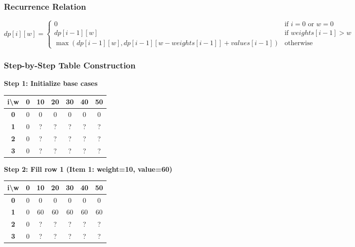 \documentclass[12pt,a4paper]{article}
\begin{document}
\subsubsection{Recurrence Relation}
\begin{equation}
dp[i][w] = \begin{cases}
0 & \text{if } i = 0 \text{ or } w = 0 \\
dp[i-1][w] & \text{if } weights[i-1] > w \\
\max(dp[i-1][w], dp[i-1][w-weights[i-1]] + values[i-1]) & \text{otherwise}
\end{cases}
\end{equation}

\subsubsection{Step-by-Step Table Construction}

\textbf{Step 1: Initialize base cases}
\begin{center}
\begin{tabular}{|c|c|c|c|c|c|c|}
\hline
\textbf{i\textbackslash w} & \textbf{0} & \textbf{10} & \textbf{20} & \textbf{30} & \textbf{40} & \textbf{50} \\
\hline
\textbf{0} & 0 & 0 & 0 & 0 & 0 & 0 \\
\hline
\textbf{1} & 0 & ? & ? & ? & ? & ? \\
\hline
\textbf{2} & 0 & ? & ? & ? & ? & ? \\
\hline
\textbf{3} & 0 & ? & ? & ? & ? & ? \\
\hline
\end{tabular}
\end{center}

\textbf{Step 2: Fill row 1 (Item 1: weight=10, value=60)}
\begin{center}
\begin{tabular}{|c|c|c|c|c|c|c|}
\hline
\textbf{i\textbackslash w} & \textbf{0} & \textbf{10} & \textbf{20} & \textbf{30} & \textbf{40} & \textbf{50} \\
\hline
\textbf{0} & 0 & 0 & 0 & 0 & 0 & 0 \\
\hline
\textbf{1} & 0 & 60 & 60 & 60 & 60 & 60 \\
\hline
\textbf{2} & 0 & ? & ? & ? & ? & ? \\
\hline
\textbf{3} & 0 & ? & ? & ? & ? & ? \\
\hline
\end{tabular}
\end{center}
\end{document}
